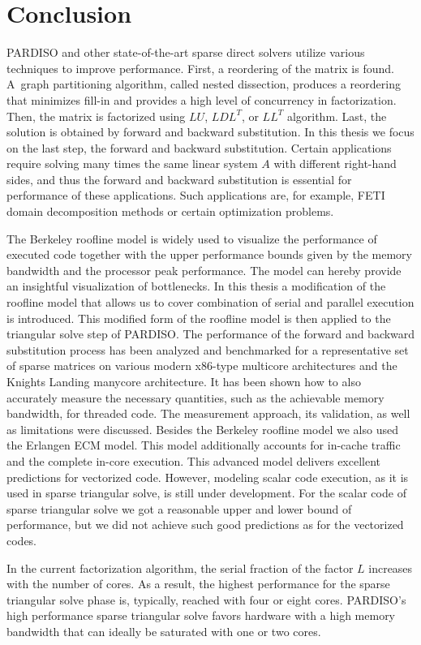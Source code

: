 \chapter{Conclusion}
\label{sec:conclusion}

PARDISO and other state-of-the-art sparse direct solvers utilize various techniques to improve performance. First, a reordering of the matrix is found. A~graph partitioning algorithm, called nested dissection, produces a reordering that minimizes fill-in and provides a high level of concurrency in factorization. Then, the matrix is factorized using $LU$, $LDL^T$, or $LL^T$ algorithm. Last, the solution is obtained by forward and backward substitution. In this thesis we focus on the last step, the forward and backward substitution. Certain applications require solving many times the same linear system $A$ with different right-hand sides, and thus the forward and backward substitution is essential for performance of these applications. Such applications are, for example, FETI domain decomposition methods or certain optimization problems.

The Berkeley roofline model is widely used to visualize the performance of executed code together with the upper performance bounds given by the memory bandwidth and the processor peak performance. The model can hereby provide an insightful visualization of bottlenecks. In this thesis a modification of the roofline model that allows us to cover combination of serial and parallel execution is introduced. This modified form of the roofline model is then applied to the triangular solve step of PARDISO. The performance of the forward and backward substitution process has been analyzed and benchmarked for a representative set of sparse matrices on various modern x86-type multicore architectures and the Knights Landing manycore architecture. It has been shown how to also accurately measure the necessary quantities, such as the achievable memory bandwidth, for threaded code. The measurement approach, its validation, as well as limitations were discussed.
Besides the Berkeley roofline model we also used the Erlangen ECM model. This model additionally accounts for in-cache traffic and the complete in-core execution. This advanced model delivers excellent predictions for vectorized code. However, modeling scalar code execution, as it is used in sparse triangular solve, is still under development. For the scalar code of sparse triangular solve we got a reasonable upper and lower bound of performance, but we did not achieve such good predictions as for the vectorized codes.

In the current factorization algorithm, the serial fraction of the factor $L$
increases with the number of cores. As a result, the highest performance for the sparse triangular solve phase is, typically, reached with four or eight cores.
PARDISO's high performance sparse triangular solve favors hardware with a high
memory bandwidth that can ideally be saturated with one or two cores.
